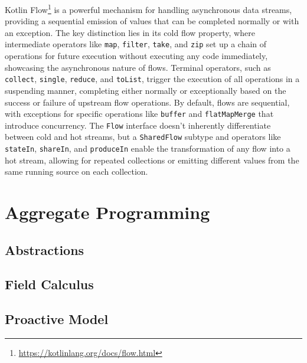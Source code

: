 \documentclass[12pt,a4paper,openright,twoside]{book}
\begin{document}
Kotlin Flow\footnote{\url{https://kotlinlang.org/docs/flow.html}} is a powerful mechanism for handling asynchronous data streams, providing a sequential emission of values that can be completed normally or with an exception. The key distinction lies in its cold flow property, where intermediate operators like \texttt{map}, \texttt{filter}, \texttt{take}, and \texttt{zip} set up a chain of operations for future execution without executing any code immediately, showcasing the asynchronous nature of flows. Terminal operators, such as \texttt{collect}, \texttt{single}, \texttt{reduce}, and \texttt{toList}, trigger the execution of all operations in a suspending manner, completing either normally or exceptionally based on the success or failure of upstream flow operations. By default, flows are sequential, with exceptions for specific operations like \texttt{buffer} and \texttt{flatMapMerge} that introduce concurrency. The \texttt{Flow} interface doesn't inherently differentiate between cold and hot streams, but a \texttt{SharedFlow} subtype and operators like \texttt{stateIn}, \texttt{shareIn}, and \texttt{produceIn} enable the transformation of any flow into a hot stream, allowing for repeated collections or emitting different values from the same running source on each collection.






\section{Aggregate Programming}

\subsection{Abstractions}


\subsection{Field Calculus}

\subsection{Proactive Model}
\end{document}
